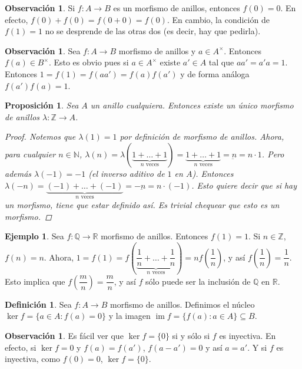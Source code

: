 \documentclass[12pt]{book}
\newtheorem{prop}[teo]{Proposición}
\theoremstyle{definition}
\newtheorem{obs}[teo]{Observación}
\newtheorem{defn}[teo]{Definición}
\newtheorem{ex}[teo]{Ejemplo}
\newcommand{\RR}{\mathbb{R}}      %
\newcommand{\ZZ}{\mathbb{Z}}      %
\newcommand{\NN}{\mathbb{N}}
\newcommand{\QQ}{\mathbb{Q}}
\DeclareMathOperator{\im}{im}
\begin{document}
\begin{obs}
Si $f:A\to B$ es un morfismo de anillos, entonces $f(0)=0$. En efecto, $f(0)+f(0)=f(0+0)= f(0)$. En cambio, la condición de $f(1)=1$ no se desprende de las otras dos (es decir, hay que pedirla).
\end{obs}

\begin{obs}
Sea $f:A\to B$ morfismo de anillos y $a\in A^\times$. Entonces $f(a)\in B^\times$. Esto es obvio pues si $a\in A^\times$ existe $a'\in A$ tal que $aa'=a'a=1$. Entonces $1=f(1)=f(aa') = f(a)f(a') $ y de forma análoga $f(a')f(a)=1$.
\end{obs}

\begin{prop}
Sea $A$ un anillo cualquiera. Entonces existe un único morfismo de anillos $\lambda: \ZZ \to A$.
\begin{proof}
Notemos que $\lambda(1)=1$ por definición de morfismo de anillos. Ahora, para cualquier $n\in \NN$, $\lambda(n)=\lambda(\underbrace{1+\ldots + 1}_{n \text{ veces}}) = \underbrace{1 +\ldots + 1}_{n\text{ veces}} = \underbar{n} = n\cdot 1$. Pero además $\lambda(-1) = -1$ (el inverso aditivo de $1$ en $A$). Entonces $\lambda(-n) = \underbrace{(-1)+\ldots + (-1)}_{n \text{ veces}} = - \underbar{n} = n\cdot (-1)$. Esto quiere decir que si hay un morfismo, tiene que estar definido así. Es trivial chequear que esto es un morfismo.
\end{proof}
\end{prop}

\begin{ex}
Sea $f:\QQ\to \RR$ morfismo de anillos. Entonces $f(1)=1$. Si $n\in \ZZ$, $f(n)=n$. Ahora, $1= f(1)=f\left(\underbrace{\dfrac{1}{n} + \ldots + \dfrac{1}{n}}_{n \text{ veces}}\right) = nf\left(\dfrac{1}{n}\right)$, y así $f\left(\dfrac{1}{n}\right) = \dfrac{1}{n}$. Esto implica que $f\left( \dfrac{m}{n}\right) = \dfrac{m}{n}$, y así $f$ sólo puede ser la inclusión de $\QQ$ en $\RR$.
\end{ex}

\begin{defn}
Sea $f:A\to B$ morfismo de anillos. Definimos el núcleo $\ker f = \{a\in A : f(a)=0\}$ y la imagen $\im f = \{f(a) : a\in A\}\subseteq B$.
\end{defn}

\begin{obs}
Es fácil ver que $\ker f = \{0\}$ si y sólo si $f$ es inyectiva. En efecto, si $\ker f = 0$ y $f(a)=f(a')$, $f(a-a')=0$ y así $a=a'$. Y si $f$ es inyectiva, como $f(0)=0$, $\ker f = \{0 \}$.
\end{obs}
\end{document}
